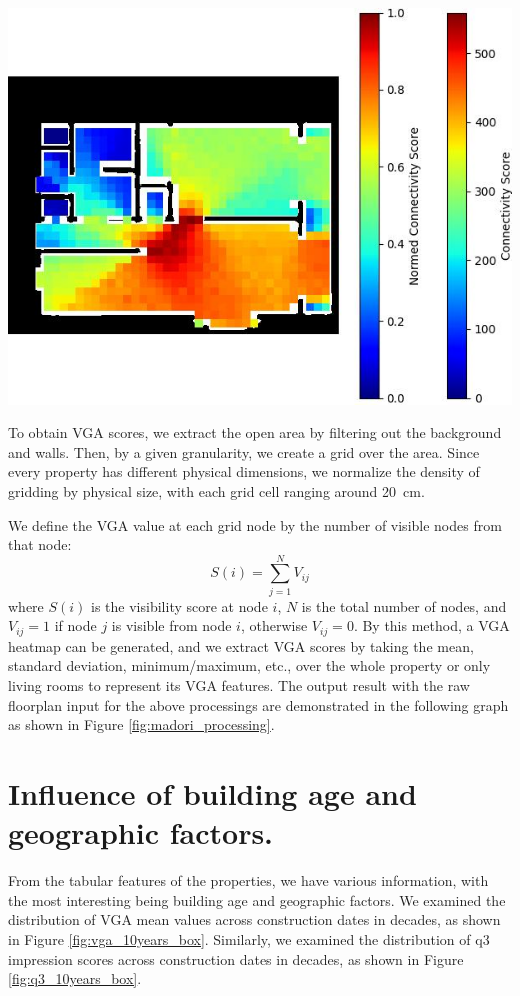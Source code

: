 \documentclass[11pt,a4paper]{article}
\begin{document}
\begin{multicols}{2}
\begin{flushleft}
    \includegraphics[width=0.7\columnwidth]{plots/exp_madori_semseg_vga.jpg}
    \label{fig:madori_processing}
\end{flushleft}

To obtain VGA scores, we extract the open area by filtering out the background 
and walls. Then, by a given granularity, we create a grid over the area. Since every property has different 
physical dimensions, we normalize the density of gridding by physical size, with each grid cell ranging around 20~cm.

We define the VGA value at each grid node by the number of visible nodes from that node:
\begin{equation}
\label{eq:vga_definition}
S(i) = \sum_{j=1}^{N} V_{ij}
\end{equation}
where $S(i)$ is the visibility score at node $i$, $N$ is the total number of nodes, and $V_{ij} = 1$ if node $j$ 
is visible from node $i$, otherwise $V_{ij} = 0$.
By this method, a VGA heatmap can be generated, and we extract VGA scores by taking the mean, standard deviation, 
minimum/maximum, etc., over the whole property or only living rooms to represent its VGA features. 
The output result with the raw floorplan input for the above processings are demonstrated in the following graph 
as shown in Figure \ref{fig:madori_processing}.


\section{Influence of building age and geographic factors.}
From the tabular features of the properties, we have various information, with the most interesting being building age and geographic factors. 
We examined the distribution of VGA mean values across construction dates in decades, as shown in Figure \ref{fig:vga_10years_box}.
Similarly, we examined the distribution of q3 impression scores across construction dates in decades, as shown in Figure \ref{fig:q3_10years_box}.


\end{multicols}
\end{document}
